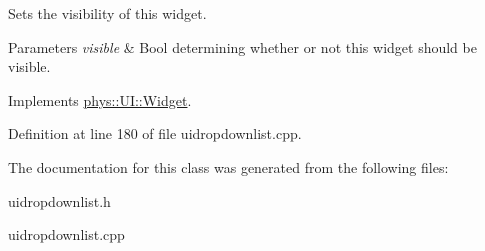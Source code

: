 Sets the visibility of this widget. 


\begin{DoxyParams}{Parameters}
{\em visible} & Bool determining whether or not this widget should be visible. \\
\hline
\end{DoxyParams}


Implements \hyperlink{classphys_1_1UI_1_1Widget_ab049233d8d5522a6ab42654b8924a3e0}{phys::UI::Widget}.



Definition at line 180 of file uidropdownlist.cpp.



The documentation for this class was generated from the following files:\begin{DoxyCompactItemize}
\item 
uidropdownlist.h\item 
uidropdownlist.cpp\end{DoxyCompactItemize}
